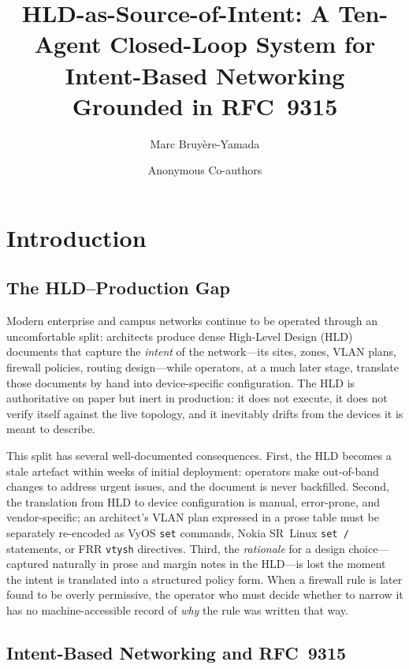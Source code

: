 \documentclass[acmtog]{acmart}
\title{HLD-as-Source-of-Intent: A Ten-Agent Closed-Loop System for
  Intent-Based Networking Grounded in RFC~9315}
\author{Marc Bruy\`ere-Yamada}
\affiliation{%
  \institution{T\'el\'ecom SudParis}
  \city{\'Evry-Courcouronnes}
  \country{France}
}
\affiliation{%
  \institution{JFLI --- Japanese-French Laboratory for Informatics}
  \city{Tokyo}
  \country{Japan}
}
\author{Anonymous Co-authors}
\affiliation{%
  \institution{TBD}
  \country{}
}
\renewcommand\_{\textunderscore\allowbreak}
\begin{document}
\maketitle

\section{Introduction}\label{sec:intro}

\subsection{The HLD--Production Gap}

Modern enterprise and campus networks continue to be operated through
an uncomfortable split: architects produce dense High-Level Design
(HLD) documents that capture the \emph{intent} of the network---its
sites, zones, VLAN plans, firewall policies, routing design---while
operators, at a much later stage, translate those documents by hand
into device-specific configuration. The HLD is authoritative on paper
but inert in production: it does not execute, it does not verify
itself against the live topology, and it inevitably drifts from the
devices it is meant to describe.

This split has several well-documented consequences. First, the HLD
becomes a stale artefact within weeks of initial deployment: operators
make out-of-band changes to address urgent issues, and the document
is never backfilled. Second, the translation from HLD to device
configuration is manual, error-prone, and vendor-specific; an
architect's VLAN plan expressed in a prose table must be separately
re-encoded as VyOS \texttt{set} commands, Nokia SR~Linux \texttt{set /}
statements, or FRR \texttt{vtysh} directives. Third, the
\emph{rationale} for a design choice---captured naturally in prose and
margin notes in the HLD---is lost the moment the intent is translated
into a structured policy form. When a firewall rule is later found to
be overly permissive, the operator who must decide whether to narrow
it has no machine-accessible record of \emph{why} the rule was
written that way.

\subsection{Intent-Based Networking and RFC~9315}
\end{document}
